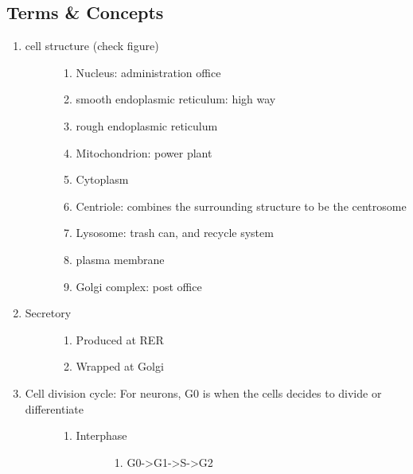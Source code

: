 \documentclass[letterpaper,10pt,english]{sphinxmanual}
\begin{document}
\subsection{Terms \& Concepts}
\label{\detokenize{neuroscience/biology:terms-concepts}}\begin{enumerate}
\item {} \begin{description}
\item[{cell structure (check figure)}] \leavevmode\begin{enumerate}
\item {} 
Nucleus: administration office

\item {} 
smooth endoplasmic reticulum: high way

\item {} 
rough endoplasmic reticulum

\item {} 
Mitochondrion: power plant

\item {} 
Cytoplasm

\item {} 
Centriole: combines the surrounding structure to be the centrosome

\item {} 
Lysosome: trash can, and recycle system

\item {} 
plasma membrane

\item {} 
Golgi complex: post office

\end{enumerate}

\end{description}

\item {} \begin{description}
\item[{Secretory}] \leavevmode\begin{enumerate}
\item {} 
Produced  at RER

\item {} 
Wrapped at Golgi

\end{enumerate}

\end{description}

\item {} \begin{description}
\item[{Cell division cycle: For neurons, G0 is when the cells decides to divide or differentiate}] \leavevmode\begin{enumerate}
\item {} \begin{description}
\item[{Interphase}] \leavevmode\begin{enumerate}
\item {} 
G0-\textgreater{}G1-\textgreater{}S-\textgreater{}G2


\end{enumerate}
\end{description}
\end{enumerate}
\end{description}
\end{enumerate}
\end{document}

